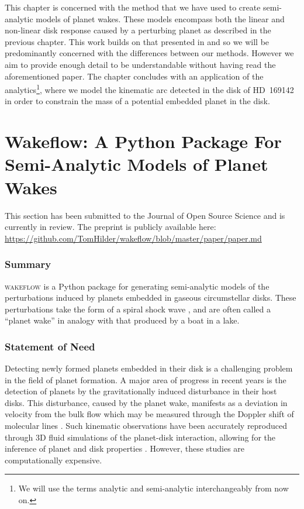 \setlength{\headheight}{13.59999pt}

This chapter is concerned with the method that we have used to create semi-analytic models of planet wakes.
These models encompass both the linear and non-linear disk response caused by a perturbing planet as described in the previous chapter. 
This work builds on that presented in \citet{bollati2021} and so we will be predominantly concerned with the differences between our methods.
However we aim to provide enough detail to be understandable without having read the aforementioned paper.
The chapter concludes with an application of the analytics\footnote{We will use the terms analytic and semi-analytic interchangeably from now on.}, where we model the kinematic arc detected in the disk of HD~169142 in order to constrain the mass of a potential embedded planet in the disk.

\section{Wakeflow: A Python Package For Semi-Analytic Models of Planet Wakes} \label{sec:JOSS}

This section has been submitted to the Journal of Open Source Science and is currently in review. The preprint is publicly available here: \url{https://github.com/TomHilder/wakeflow/blob/master/paper/paper.md}

\subsubsection{Summary}

\textsc{wakeflow} is a Python package for generating semi-analytic models of the perturbations induced by planets embedded in gaseous circumstellar disks. 
These perturbations take the form of a spiral shock wave \citep{ogilvie2002}, and are often called a ``planet wake'' in analogy with that produced by a boat in a lake.

\subsubsection{Statement of Need}

Detecting newly formed planets embedded in their disk is a challenging problem in the field of planet formation. 
A major area of progress in recent years is the detection of planets by the gravitationally induced disturbance in their host disks. 
This disturbance, caused by the planet wake, manifests as a deviation in velocity from the bulk flow which may be measured through the Doppler shift of molecular lines \citep[e.g.][]{perez2015, pinte2018a}. 
Such kinematic observations have been accurately reproduced through 3D fluid simulations of the planet-disk interaction, allowing for the inference of planet and disk properties \citep{pinte2018a, pinte2019}. 
However, these studies are computationally expensive.

